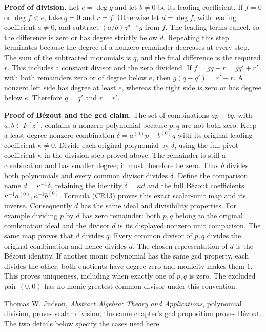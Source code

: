 \documentclass[
  11pt,
]{article}
\begin{document}
\textbf{Proof of division.} Let \(e=\deg g\) and let \(b\ne0\) be its
leading coefficient. If \(f=0\) or \(\deg f<e\), take \(q=0\) and
\(r=f\). Otherwise let \(d=\deg f\), with leading coefficient \(a\ne0\),
and subtract \((a/b)z^{d-e}g\) from \(f\). The leading terms cancel, so
the difference is zero or has degree strictly below \(d\). Repeating
this step terminates because the degree of a nonzero remainder decreases
at every step. The sum of the subtracted monomials is \(q\), and the
final difference is the required \(r\). This includes a constant divisor
and the zero dividend. If \(f=gq+r=gq'+r'\) with both remainders zero or
of degree below \(e\), then \(g(q-q')=r'-r\). A nonzero left side has
degree at least \(e\), whereas the right side is zero or has degree
below \(e\). Therefore \(q=q'\) and \(r=r'\).

\textbf{Proof of Bézout and the gcd claim.} The set of combinations
\(ap+bq\), with \(a,b\in F[z]\), contains a nonzero polynomial because
\(p,q\) are not both zero. Keep a least-degree nonzero combination
\(\delta=a^{(0)}p+b^{(0)}q\) with its original leading coefficient
\(\kappa\ne0\). Divide each original polynomial by \(\delta\), using the
full pivot coefficient \(\kappa\) in the division step proved above. The
remainder is still a combination and has smaller degree; it must
therefore be zero. Thus \(\delta\) divides both polynomials and every
common divisor divides \(\delta\). Define the comparison name
\(d=\kappa^{-1}\delta\), retaining the identity \(\delta=\kappa d\) and
the full Bézout coefficients \(\kappa^{-1}a^{(0)},\kappa^{-1}b^{(0)}\).
Formula (CR13) proves this exact scalar-unit map and its inverse.
Consequently \(d\) has the same ideal and divisibility properties. For
example dividing \(p\) by \(d\) has zero remainder: both \(p,q\) belong
to the original combination ideal and the divisor \(d\) is its displayed
nonzero unit comparison. The same map proves that \(d\) divides \(q\).
Every common divisor of \(p,q\) divides the original combination and
hence divides \(d\). The chosen representation of \(d\) is the Bézout
identity. If another monic polynomial has the same gcd property, each
divides the other; both quotients have degree zero and monicity makes
them \(1\). This proves uniqueness, including when exactly one of
\(p,q\) is zero. The excluded pair \((0,0)\) has no monic greatest
common divisor under this convention.

Thomas W. Judson,
\href{https://github.com/twjudson/aata/blob/3069910e3ded72ff5e18837a97a0e810c92790e2/src/poly.xml\#L307-L390}{\emph{Abstract
Algebra: Theory and Applications}, polynomial division}, proves scalar
division; the same chapter's
\href{https://github.com/twjudson/aata/blob/3069910e3ded72ff5e18837a97a0e810c92790e2/src/poly.xml\#L590-L676}{gcd
proposition} proves Bézout. The two details below specify the cases used
here.
\end{document}
